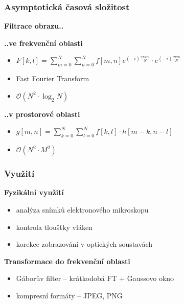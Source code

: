 \documentclass[10pt, xcolor=pdflatex, dvipsnames, table]{beamer}
\begin{document}
\begin{frame}
\frametitle{Asymptotická časová složitost}
\textbf{Filtrace obrazu..}

\vspace{1em}

\textbf{..ve frekvenční oblasti}
\begin{itemize}
\item $F[k,l] = \sum_{m=0}^{N}{\sum_{n=0}^{N}{f[m,n]e^{(-i)\frac{2\pi km}{N}}\cdot e^{(-i)\frac{2\pi ln}{N}}}}$
\item Fast Fourier Transform
\item $\mathcal{O}(N^2 \cdot \log_{2}{N})$ 
\end{itemize}

\vspace{1em}

\textbf{..v prostorové oblasti}
\begin{itemize}
\item $g[m,n] = \sum_{k=0}^{N}{\sum_{l=0}^{N}{f[k,l]\cdot h[m-k, n-l]}}$
\item $\mathcal{O}(N^2 \cdot M^2)$ 
\end{itemize}

\end{frame}





\begin{frame}
\frametitle{Využití}
\textbf{Fyzikální využití}
\begin{itemize}
\item analýza snímků elektronového mikroskopu
\item kontrola tloušťky vláken
\item korekce zobrazování v optických soustavách
\end{itemize}

\vspace{1em}

\textbf{Transformace do frekvenční oblasti}
\begin{itemize}
\item Gáborův filter -- krátkodobá FT + Gaussovo okno 
\item kompresní formáty -- JPEG, PNG
\end{itemize}
\end{frame}


\end{document}
